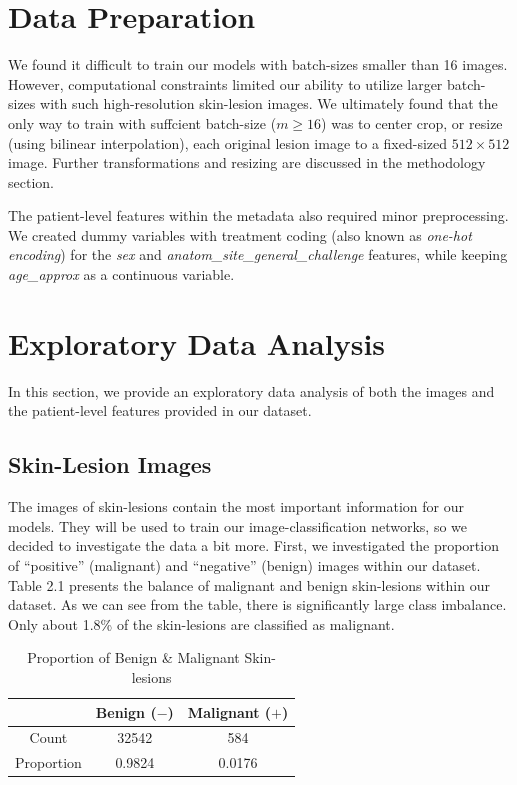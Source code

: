 \documentclass [MAS] {uclathes}
\begin{document}
\section{Data Preparation}

We found it difficult to train our models with batch-sizes smaller than 16 images. However, computational constraints limited our ability to utilize larger batch-sizes with such high-resolution skin-lesion images. We ultimately found that the only way to train with suffcient batch-size ($m \geq 16$) was to center crop, or resize (using bilinear interpolation), each original lesion image to a fixed-sized $512 \times 512$ image. Further transformations and resizing are discussed in the methodology section.

The patient-level features within the metadata also required minor preprocessing. We created dummy variables with treatment coding (also known as \textit{one-hot encoding}) for the \textit{sex} and \textit{anatom\_site\_general\_challenge} features, while keeping \textit{age\_approx} as a continuous variable.


\section{Exploratory Data Analysis}

In this section, we provide an exploratory data analysis of both the images and the patient-level features provided in our dataset.

\subsection{Skin-Lesion Images}

The images of skin-lesions contain the most important information for our models. They will be used to train our image-classification networks, so we decided to investigate the data a bit more. First, we investigated the proportion of ``positive'' (malignant) and ``negative'' (benign) images within our dataset. Table 2.1 presents the balance of malignant and benign skin-lesions within our dataset. As we can see from the table, there is significantly large class imbalance. Only about 1.8\% of the skin-lesions are classified as malignant. 

\begin{table}[h!]
\centering
\begin{tabular}{| c | c | c |} 
\hline
& Benign ($-$) & Malignant ($+$) \\ 
\hline
\hline
Count & 32542 & 584\\
\hline
Proportion & 0.9824 & 0.0176\\
\hline  
\end{tabular}
\label{tab:propMel}
\caption{Proportion of Benign \& Malignant Skin-lesions}
\end{table}
\end{document}
